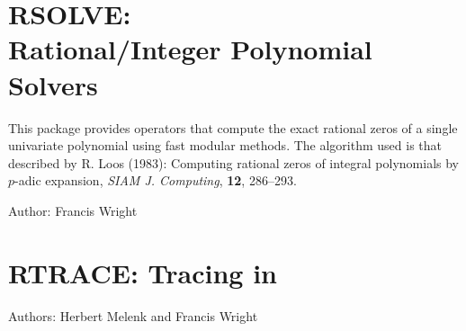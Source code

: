 

\newpage

\iffalse
\section{ROOTS: A \REDUCE Root Finding Package}
\indexpackage{ROOTS}

This root finding package can be used to find some or all of the roots of a
univariate polynomial with real or complex coefficients, to the accuracy
specified by the user.

It is designed so that it can be used as an independent package, or it may
be called from {\tt SOLVE} if {\tt ROUNDED} is on. For example,
the evaluation of
\begin{verbatim}
        on rounded,complex;
        solve(x**3+x+5,x);
\end{verbatim}
yields the result
\begin{verbatim}
    {X= - 1.51598,X=0.75799 + 1.65035*I,X=0.75799 - 1.65035*I}
\end{verbatim}

This package loads automatically.

Author: Stanley L. Kameny



\newpage
\fi

\iffalse
\section[RSOLVE: Rational/Integer Polynomial Solvers]%
        {RSOLVE: \protect\\ Rational/Integer Polynomial Solvers}


This package provides operators that compute the exact rational zeros
of a single univariate polynomial using fast modular methods.  The
algorithm used is that described by R. Loos (1983): Computing rational
zeros of integral polynomials by $p$-adic expansion, \textit{SIAM J.
Computing}, \textbf{12}, 286--293.

Author: Francis Wright



\newpage
\section{RTRACE: Tracing in \REDUCE}

Authors: Herbert Melenk and Francis Wright

